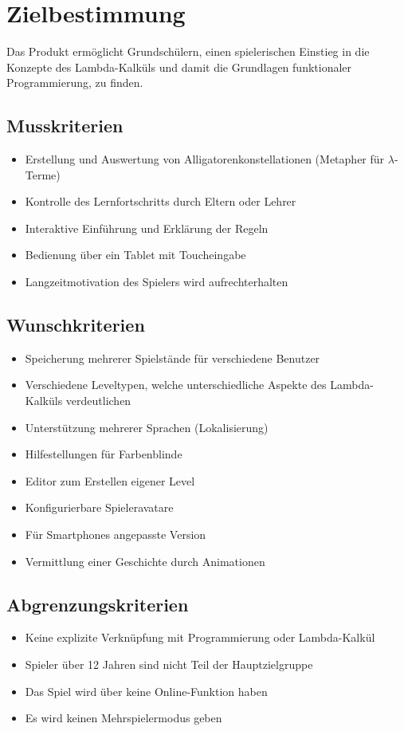 \section{Zielbestimmung}
Das Produkt ermöglicht Grundschülern, einen spielerischen Einstieg in die Konzepte des Lambda-Kalküls und damit die Grundlagen funktionaler Programmierung, zu finden.

\subsection{Musskriterien}

\begin{itemize}
	\item Erstellung und Auswertung von Alligatorenkonstellationen (Metapher für \(\lambda\)-Terme)
	\item Kontrolle des Lernfortschritts durch Eltern oder Lehrer
	\item Interaktive Einführung und Erklärung der Regeln
	\item Bedienung über ein Tablet mit Toucheingabe
	\item Langzeitmotivation des Spielers wird aufrechterhalten
\end{itemize}


\subsection{Wunschkriterien}

\begin{itemize}
	\item Speicherung mehrerer Spielstände für verschiedene Benutzer
	\item Verschiedene Leveltypen, welche unterschiedliche Aspekte des Lambda-Kalküls verdeutlichen
	\item Unterstützung mehrerer Sprachen (Lokalisierung)
	\item Hilfestellungen für Farbenblinde
	\item Editor zum Erstellen eigener Level
	\item Konfigurierbare Spieleravatare
	\item Für Smartphones angepasste Version
	\item Vermittlung einer Geschichte durch Animationen
\end{itemize}


\subsection{Abgrenzungskriterien}

\begin{itemize}
	\item Keine explizite Verknüpfung mit Programmierung oder Lambda-Kalkül
	\item Spieler über 12 Jahren sind nicht Teil der Hauptzielgruppe
	\item Das Spiel wird über keine Online-Funktion haben
	\item Es wird keinen Mehrspielermodus geben
\end{itemize}
